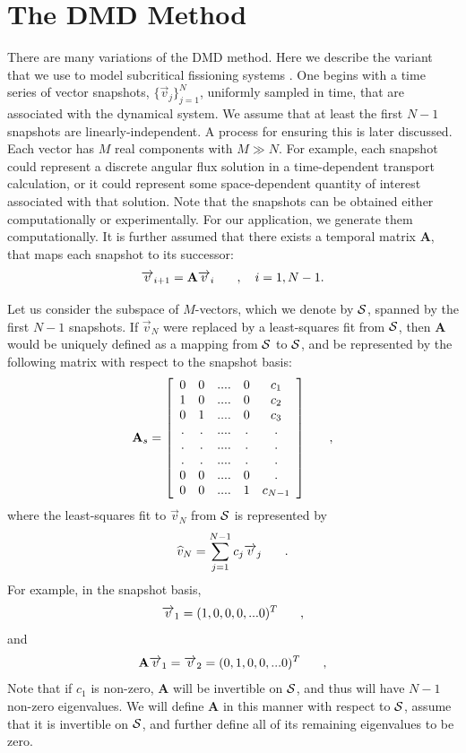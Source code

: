 \documentclass{style/nseJournal}
\newcommand{\bracket}[1]{\left[ #1 \right]}
\renewcommand{\vec}[1]{\overrightarrow{#1}}
\newcommand{\be}{\begin{equation}}
\newcommand{\ee}{\end{equation}}
\newcommand{\pec}{\hspace{0.25in},}
\newcommand{\pep}{\hspace{0.25in}.}
\newcommand{\LEQ}[1]{\label{eq:#1}}
\newcommand{\cS}{{\cal S}}
\newcommand{\mA}{\mathbf{A}}
\begin{document}
\section{The DMD Method}
There are many variations of the DMD method.  
Here we describe the variant that we use to model subcritical fissioning systems \cite{kutz2016dynamic} \cite{schmid2010dynamic}.  
One begins with a time series of vector snapshots, $\{\vec{v}_j\}_{j=1}^{N}$, uniformly sampled in time, that are associated with the dynamical system.  
We assume that at least the first $N-1$ snapshots are linearly-independent.  
A process for ensuring this is later discussed.  
Each vector has $M$ real components with $M \gg N$.  
For example, each snapshot could represent a discrete angular flux solution in a time-dependent transport calculation, or it could represent some space-dependent quantity of interest associated with that solution.  
Note that the snapshots can be obtained either computationally or experimentally.  
For our application, we generate them computationally.  
It is further assumed that there exists a temporal matrix $\mathbf{A}$, that maps each snapshot to its successor:
\be
	\vec{v}_{i+1} = \mA \vec{v}_{i} \pec \quad i=1,N-1.
\LEQ{2.1}
\ee

Let us consider the subspace of $M$-vectors, which we denote by $\cS$, spanned by the first $N-1$ snapshots.  
If $\vec{v}_N$ were replaced by a least-squares fit from $\cS$, then $\mA$ would be uniquely defined as a mapping from $\cS$ to $\cS$, and be represented by the following matrix with respect to the snapshot basis:
\be
	\mA_s = \bracket{
		\begin{array}{ccccccc}
			0 & 0 & ....& 0 & c_1 \\
			1 & 0 & ....& 0 & c_2 \\
			0 & 1 & ....& 0 & c_3 \\
			. & . & ....& . & . \\
			. & . & ....& . & . \\
			. & . & ....& . & . \\
			0 & 0 & ....& 0 & . \\
			0 & 0 & ....& 1 & c_{N-1}
	\end{array}
	} \pec
	\LEQ{2.2}
\ee
where the least-squares fit to $\vec{v}_N$ from $\cS$ is represented by
\be
	\widehat{v}_N = \sum_{j=1}^{N-1} c_j \vec{v}_j \pep
	\LEQ{2.3}
\ee
For example, in the snapshot basis,
\be
	\vec{v}_1 = (1,0,0,0,...0)^T \pec
	\LEQ{2.4}
\ee
and 
\be
	\mA \vec{v}_1 = \vec{v}_2 = (0,1,0,0,...0)^T \pec
	\LEQ{2.5}
\ee
Note that if $c_1$ is non-zero, $\mA$ will be invertible on $\cS$, and thus will have $N-1$ non-zero eigenvalues.  
We will define $\mA$ in this manner with respect to $\cS$, assume that it is invertible on $\cS$, and further define all of its remaining eigenvalues to be zero.  
\end{document}
